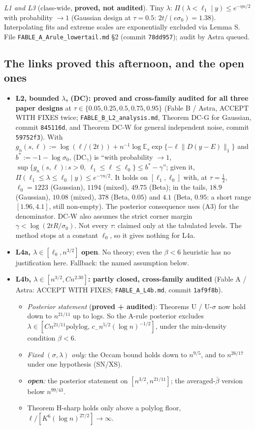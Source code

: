 \documentclass[11pt]{article}
\newcommand{\E}{\mathbb{E}}
\newcommand{\norm}[1]{\lVert #1\rVert}
\newcommand{\PA}{\textcolor{proved}{\textbf{proved + audited}}}
\newcommand{\PU}{\textcolor{progress}{\textbf{proved, not audited}}}
\newcommand{\OP}{\textcolor{open}{\textbf{open}}}
\theoremstyle{plain}
\begin{document}
\noindent\textit{L1 and L3} (class-wide, \PU). Tiny $\lambda$: $\Pi(\lambda<\ell_1\mid y)\le e^{-\eta n/2}$ with probability $\to1$ (Gaussian design at $\tau=0.5$: $2t/(e\sigma_0)=1.38$). Interpolating fits and extreme scales are exponentially excluded via Lemma S. File \texttt{FABLE\_A\_Arule\_lowertail.md} \S2 (commit \texttt{78dd957}); audit by Astra queued.

\subsection{The links proved this afternoon, and the open ones}

\begin{itemize}
\item \textbf{L2, bounded $\lambda$, (DC): proved and cross-family audited for all three paper designs} at $\tau\in\{0.05,0.25,0.5,0.75,0.95\}$ (Fable B / Astra, ACCEPT WITH FIXES twice; \texttt{FABLE\_B\_L2\_analysis.md}, Theorem DC-G for Gaussian, commit \texttt{845116d}, and Theorem DC-W for general independent noise, commit \texttt{59752f3}). With $g_n(s,\ell):=\log(\ell/(2t))+n^{-1}\log\E_s\exp\{-\ell\norm{D(y-E)}_1\}$ and $b^*:=-1-\log\sigma_0$, (DC$_\gamma$) is ``with probability $\to1$, $\sup\{g_n(s,\ell):s>0,\ \ell_1\le\ell\le\ell_0\}\le b^*-\gamma$''; given it, $\Pi(\ell_1\le\lambda\le\ell_0\mid y)\le e^{-\gamma n/2}$. It holds on $[\ell_1,\ell_0]$ with, at $\tau=\tfrac12$, $\ell_0=1223$ (Gaussian), $1194$ (mixed), $49.75$ (Beta); in the tails, $18.9$ (Gaussian), $10.08$ (mixed), $378$ (Beta, $0.05$) and $4.1$ (Beta, $0.95$: a short range $[1.96,4.1]$, still non-empty). The posterior consequence uses (A3) for the denominator. DC-W also assumes the strict corner margin $\gamma<\log(2tR/\sigma_0)$. Not every $\tau$: claimed only at the tabulated levels. The method stops at a constant $\ell_0$, so it gives nothing for L4a.
\item \textbf{L4a, $\lambda\in[\ell_0,n^{3/2}]$} \OP. No theory; even the $\beta<6$ heuristic has no justification here. Fallback: the named assumption below.
\item \textbf{L4b, $\lambda\in[n^{3/2},Cn^{2.30}]$: partly closed, cross-family audited} (Fable A / Astra: ACCEPT WITH FIXES; \texttt{FABLE\_A\_L4b.md}, commit \texttt{1af9f8b}).
\begin{itemize}
\item \emph{Posterior statement} (\PA): Theorems U / U-$\sigma$ now hold down to $n^{21/11}$ up to logs. So the A-rule posterior excludes $\lambda\in[Cn^{21/11}\mathrm{polylog},\,c_-n^{5/2}(\log n)^{-1/2}]$, under the min-density condition $\beta<6$.
\item \emph{Fixed $(\sigma,\lambda)$ only:} the Occam bound holds down to $n^{9/5}$, and to $n^{26/17}$ under one hypothesis (SN/XS).
\item \emph{\OP:} the posterior statement on $[n^{3/2},n^{21/11}]$; the averaged-$\bar\beta$ version below $n^{99/43}$.
\item Theorem H-sharp holds only above a polylog floor, $\ell/[K^6(\log n)^{27/2}]\to\infty$.
\end{itemize}
\end{itemize}
\end{document}
